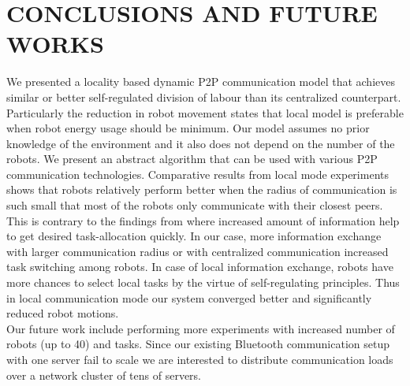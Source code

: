 \documentclass[letterpaper, 10 pt, conference]{ieeeconf}  %
\begin{document}
\section{CONCLUSIONS AND FUTURE WORKS}
\label{sec:conc}
We presented a locality based dynamic P2P communication model that achieves similar or better  self-regulated division of labour than its centralized counterpart. Particularly the reduction in robot movement states that local model is preferable when robot energy usage should be minimum. Our model assumes no prior knowledge of the environment and it also does not depend on the number of the robots. We  present an abstract algorithm that can be used with various P2P communication technologies. Comparative results from local mode experiments shows that robots relatively perform better when the radius of communication is such small that most of the robots only communicate with their closest peers. This is contrary to the findings from \cite{Rutishauser, Epuck} where increased amount of information help to get desired task-allocation quickly. In our case, more information exchange with larger communication  radius or with centralized communication increased task switching among robots. In case of local information exchange, robots have more chances to select local tasks by the virtue of self-regulating principles. Thus in local communication mode our system converged better and significantly reduced robot motions.\\ 
Our future work include performing more experiments with increased number of robots (up to 40) and tasks. Since our existing Bluetooth communication setup with one server fail to scale we are interested to distribute communication loads over a network cluster of tens of servers.
\end{document}

